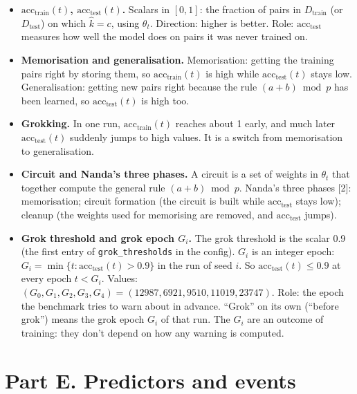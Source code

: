 \documentclass[11pt,a4paper,oneside,openany]{report}
\newcommand{\acctest}{\mathrm{acc}_{\mathrm{test}}}
\newcommand{\acctrain}{\mathrm{acc}_{\mathrm{train}}}
\newcommand{\Dtrain}{D_{\mathrm{train}}}
\newcommand{\Dtest}{D_{\mathrm{test}}}
\newcommand{\code}[1]{\texttt{#1}}
\newcommand{\gl}[1]{\textbf{#1}}   %
\newenvironment{glist}{\begin{itemize}\setlength{\itemsep}{2pt}\setlength{\parskip}{1pt}}{\end{itemize}}
\begin{document}
\begin{glist}
\item[\gl{N22}] \textbf{$\acctrain(t)$, $\acctest(t)$.} Scalars in $[0, 1]$: the fraction of pairs in $\Dtrain$ (or $\Dtest$) on which $\hat k = c$, using $\theta_t$. Direction: higher is better. Role: $\acctest$ measures how well the model does on pairs it was never trained on.
\item[\gl{N23}] \textbf{Memorisation and generalisation.} Memorisation: getting the training pairs right by storing them, so $\acctrain(t)$ is high while $\acctest(t)$ stays low. Generalisation: getting new pairs right because the rule $(a + b) \bmod p$ has been learned, so $\acctest(t)$ is high too.
\item[\gl{N24}] \textbf{Grokking.} In one run, $\acctrain(t)$ reaches about 1 early, and much later $\acctest(t)$ suddenly jumps to high values. It is a switch from memorisation to generalisation.
\item[\gl{N25}] \textbf{Circuit and Nanda's three phases.} A circuit is a set of weights in $\theta_t$ that together compute the general rule $(a+b) \bmod p$. Nanda's three phases [2]: memorisation; circuit formation (the circuit is built while $\acctest$ stays low); cleanup (the weights used for memorising are removed, and $\acctest$ jumps).
\item[\gl{N26}] \textbf{Grok threshold and grok epoch $G_i$.} The grok threshold is the scalar 0.9 (the first entry of \code{grok\_\allowbreak{}thresholds} in the config). $G_i$ is an integer epoch: $G_i = \min\{t : \acctest(t) > 0.9\}$ in the run of seed $i$. So $\acctest(t) \le 0.9$ at every epoch $t < G_i$. Values: $(G_0, G_1, G_2, G_3, G_4) = (12987, 6921, 9510, 11019, 23747)$. Role: the epoch the benchmark tries to warn about in advance. ``Grok'' on its own (``before grok'') means the grok epoch $G_i$ of that run. The $G_i$ are an outcome of training: they don't depend on how any warning is computed.
\end{glist}

\section*{Part E. Predictors and events}
\end{document}
